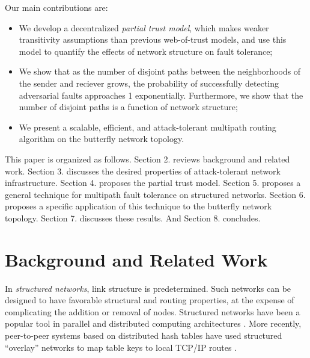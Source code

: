 \documentclass[prodmode,permissions]{acmsmall-ec16}
\begin{document}
Our main contributions are:
\begin{itemize}
\item{We develop a decentralized {\em partial trust model},
which makes weaker transitivity assumptions than previous web-of-trust models,
and use this model to quantify the effects of network structure on
fault tolerance;}
\item{We show that as the number of disjoint paths between the neighborhoods
of the sender and reciever grows,
the probability of successfully detecting adversarial faults
approaches 1 exponentially.
Furthermore, we show that the number of disjoint paths is a function of
network structure;}
\item{We present a scalable, efficient, and attack-tolerant multipath
routing algorithm on the butterfly network topology.}
\end{itemize}

This paper is organized as follows.
Section 2. reviews background and related work.
Section 3. discusses the desired properties of attack-tolerant network
infrastructure.
Section 4. proposes the partial trust model.
Section 5. proposes a general technique for multipath fault tolerance on
structured networks.
Section 6. proposes a specific application of this technique to the butterfly
network topology.
Section 7. discusses these results.
And Section 8. concludes.

\section{Background and Related Work}

In {\em structured networks}, link structure is predetermined.
Such networks can be designed to have favorable structural and routing properties,
at the expense of complicating the addition or removal of nodes.
Structured networks have been a popular tool in parallel and distributed
computing architectures \cite{kshemkalyani_distributed_2008}.
More recently, peer-to-peer systems based on distributed hash tables have used
structured ``overlay'' networks to map table keys to local TCP/IP routes
\cite{lua_survey_2005,korzun_structured_2013}.
\end{document}
